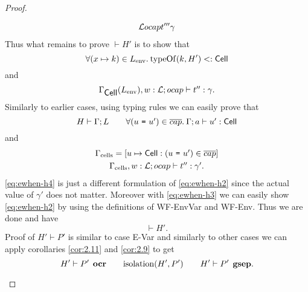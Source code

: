 \begin{proof}
\begin{description}
\begin{description}
\begin{description}
\begin{equation}
\begin{aligned}
{                  \mbox{$\mathcal{L}$}}{\mbox{$ocap$}}{t'''}{\gamma} 
                \end{aligned}
              \end{equation}
              Thus what remains to prove $\vdash H'$ is to show that
              \begin{equation} \label{eq:ewhen-h1}
                \forall (x \mapsto k) \in L_{\text{env}}.\: \mbox{$\mathrm{typeOf}$}{(k, H')} <:
                \mbox{$\mathsf{Cell}$}
              \end{equation}
              and
              \begin{equation} \label{eq:ewhen-h2}
                \mbox{$\Gamma_{\mbox{$\mathsf{Cell}$}{}}(L_{\text{env}}), w:
                \mbox{$\mathcal{L}$};\mbox{$ocap$}\vdash t'':\gamma$}.
              \end{equation}
              Similarly to earlier cases, using typing rules we can easily prove
              that
              \begin{equation}\label{eq:ewhen-h3}
                H \vdash \Gamma; L \quad\quad \forall (\mbox{$u$~\texttt{=}~$u'$}) \in
                \overline{cap}. \: \mbox{$\Gamma;a\vdash u':\mbox{$\mathsf{Cell}$}$} 
              \end{equation}
              and
              \begin{equation} \label{eq:ewhen-h4}
                \begin{gathered}
                  \Gamma_{\text{cells}} = [u \mapsto \mbox{$\mathsf{Cell}$}: (\mbox{$u$~\texttt{=}~$u'$}) \in
                  \overline{cap}] \\
                  \mbox{$\Gamma_{\text{cells}}, w:
                  \mbox{$\mathcal{L}$};\mbox{$ocap$}\vdash t'':\gamma'$}.
                \end{gathered}
              \end{equation}
              \eqref{eq:ewhen-h4} is just a different formulation of
              \eqref{eq:ewhen-h2} since the actual value of $\gamma'$ does not
              matter. Moreover with \eqref{eq:ewhen-h3} we can easily show
              \eqref{eq:ewhen-h2} by using the definitions of {\sc WF-EnvVar}
              and {\sc WF-Env}. Thus we are done and have
              \begin{equation}
                \vdash H'.
              \end{equation}
              Proof of $H' \vdash P'$ is similar to case {\sc E-Var} and
              similarly to other cases we can apply corollaries \ref{cor:2.11}
              and \ref{cor:2.9} to get
              \begin{equation}
                H' \vdash P' \:\: \mbox{\bf ocr} \quad\quad \mbox{$\mathrm{isolation}$}(H', P') \quad\quad H'
                \vdash P' \:\: \mbox{\bf gsep}.
              \end{equation}


\end{description}
\end{description}
\end{description}
\end{proof}
